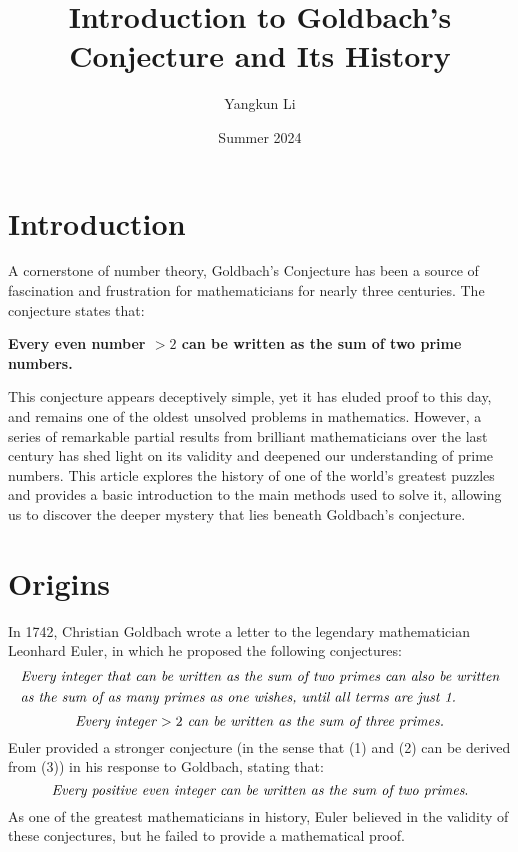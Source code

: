 \documentclass{article}
\title{Introduction to Goldbach's Conjecture and Its History}
\author{Yangkun Li}
\date{Summer 2024}
\begin{document}
\maketitle

\section*{Introduction}
A cornerstone of number theory, Goldbach's Conjecture has been a source of fascination and frustration for mathematicians for nearly three centuries. The conjecture states that:
\begin{center}
\textbf{Every even number $> 2$ can be written as the sum of two prime numbers\footnotemark{}.}
\end{center} 
This conjecture appears deceptively simple, yet it has eluded proof to this day, and remains one of the oldest unsolved problems in mathematics. However, a series of remarkable partial results from brilliant mathematicians over the last century has shed light on its validity and deepened our understanding of prime numbers. This article explores the history of one of the world's greatest puzzles and provides a basic introduction to the main methods used to solve it, allowing us to discover the deeper mystery that lies beneath Goldbach's conjecture.

\section*{Origins}
In 1742, Christian Goldbach wrote a letter to the legendary mathematician Leonhard Euler, in which he proposed the following conjectures\cite{letter}:
\begin{equation}
    \begin{aligned}
        &\emph{Every integer that can be written as the sum of two primes can also be written} \\
        &\emph{as the sum of as many primes as one wishes, until all terms are just 1.}
    \end{aligned}
\end{equation}
\begin{equation}
    \emph{Every integer $> 2$ can be written as the sum of three primes.}
\end{equation} \vskip 1mm
\noindent Euler provided a stronger conjecture (in the sense that (1) and (2) can be derived from (3)) in his response to Goldbach, stating that\cite{letter}:
\begin{equation}
    \emph{Every positive even integer can be written as the sum of two primes}. 
\end{equation} 
As one of the greatest mathematicians in history, Euler believed in the validity of these conjectures, but he failed to provide a mathematical proof\cite{letter}.
\end{document}
